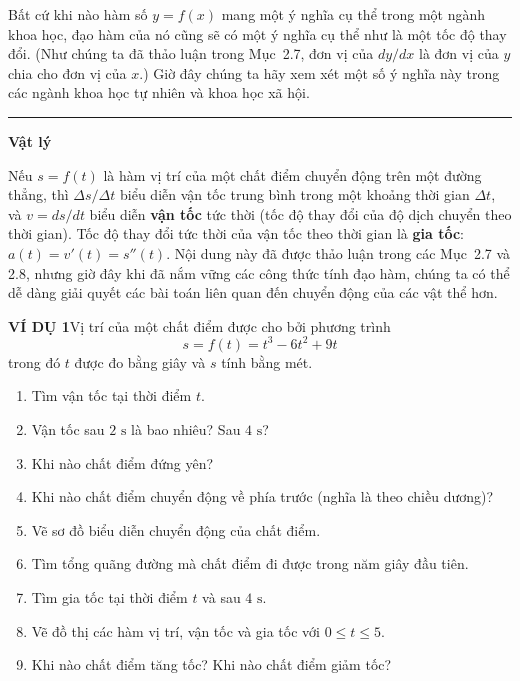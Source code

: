 Bất cứ khi nào hàm số $y = f(x)$ mang một ý nghĩa cụ thể trong một ngành khoa học, đạo hàm của nó cũng sẽ có một ý nghĩa cụ thể như là một tốc độ thay đổi. (Như chúng ta đã thảo luận trong Mục~2.7, đơn vị của $dy/dx$ là đơn vị của $y$ chia cho đơn vị của $x$.) Giờ đây chúng ta hãy xem xét một số ý nghĩa này trong các ngành khoa học tự nhiên và khoa học xã hội.

\vspace{0.4em}
{\color{stewartblue}\rule{1.1ex}{1.1ex}}\hspace{0.5em}\textbf{\textsf{Vật lý}}

\vspace{0.1em}
Nếu $s = f(t)$ là hàm vị trí của một chất điểm chuyển động trên một đường thẳng, thì $\Delta s/\Delta t$ biểu diễn vận tốc trung bình trong một khoảng thời gian $\Delta t$, và $v = ds/dt$ biểu diễn \textbf{vận tốc} tức thời (tốc độ thay đổi của độ dịch chuyển theo thời gian). Tốc độ thay đổi tức thời của vận tốc theo thời gian là \textbf{gia tốc}: $a(t) = v'(t) = s''(t)$. Nội dung này đã được thảo luận trong các Mục~2.7 và 2.8, nhưng giờ đây khi đã nắm vững các công thức tính đạo hàm, chúng ta có thể dễ dàng giải quyết các bài toán liên quan đến chuyển động của các vật thể hơn.

\vspace{0.6em}
{\color{stewartblue}\textbf{\textsf{VÍ DỤ 1}}}\hspace{0.8em}Vị trí của một chất điểm được cho bởi phương trình
\[
s = f(t) = t^3 - 6t^2 + 9t
\]
trong đó $t$ được đo bằng giây và $s$ tính bằng mét.
\begin{enumerate}[label=\textnormal{(\alph*)}, leftmargin=1.8em, itemsep=1.2pt, topsep=2pt, parsep=0pt]
  \item Tìm vận tốc tại thời điểm $t$.
  \item Vận tốc sau $2\text{ s}$ là bao nhiêu? Sau $4\text{ s}$?
  \item Khi nào chất điểm đứng yên?
  \item Khi nào chất điểm chuyển động về phía trước (nghĩa là theo chiều dương)?
  \item Vẽ sơ đồ biểu diễn chuyển động của chất điểm.
  \item Tìm tổng quãng đường mà chất điểm đi được trong năm giây đầu tiên.
  \item Tìm gia tốc tại thời điểm $t$ và sau $4\text{ s}$.
  \item Vẽ đồ thị các hàm vị trí, vận tốc và gia tốc với $0 \le t \le 5$.
  \item Khi nào chất điểm tăng tốc? Khi nào chất điểm giảm tốc?
\end{enumerate}

